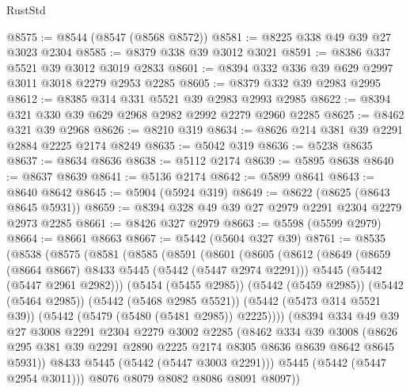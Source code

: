 \begin{lexlean}{RustStd}
\begin{coremodule}
{\begin{coremodule}
{{{{{{{{{{{{@8575 := @8544 (@8547 (@8568 @8572))
@8581 := @8225 @338 @49 @39 @27 @3023 @2304
@8585 := @8379 @338 @39 @3012 @3021
@8591 := @8386 @337 @5521 @39 @3012 @3019 @2833
@8601 := @8394 @332 @336 @39 @629 @2997 @3011 @3018 @2279 @2953 @2285
@8605 := @8379 @332 @39 @2983 @2995
@8612 := @8385 @314 @331 @5521 @39 @2983 @2993 @2985
@8622 := @8394 @321 @330 @39 @629 @2968 @2982 @2992 @2279 @2960 @2285
@8625 := @8462 @321 @39 @2968
@8626 := @8210 @319
@8634 := @8626 @214 @381 @39 @2291 @2884 @2225 @2174 @8249
@8635 := @5042 @319
@8636 := @5238 @8635
@8637 := @8634 @8636
@8638 := @5112 @2174
@8639 := @5895 @8638
@8640 := @8637 @8639
@8641 := @5136 @2174
@8642 := @5899 @8641
@8643 := @8640 @8642
@8645 := @5904 (@5924 @319)
@8649 := @8622 (@8625 (@8643 @8645 @5931))
@8659 := @8394 @328 @49 @39 @27 @2979 @2291 @2304 @2279 @2973 @2285
@8661 := @8426 @327 @2979
@8663 := @5598 (@5599 @2979)
@8664 := @8661 @8663
@8667 := @5442 (@5604 @327 @39)
@8761 := @8535
    (@8538
      (@8575
        (@8581
          (@8585
            (@8591
              (@8601
                (@8605
                  (@8612
                    (@8649
                      (@8659 (@8664 @8667) @8433 @5445 (@5442 (@5447 @2974 @2291)))
                      @5445
                      (@5442 (@5447 @2961 @2982)))
                    (@5454 (@5455 @2985))
                    (@5442 (@5459 @2985))
                    (@5442 (@5464 @2985))
                    (@5442 (@5468 @2985 @5521))
                    (@5442 (@5473 @314 @5521 @39))
                    (@5442 (@5479 (@5480 (@5481 @2985)) @2225))))
                (@8394
                  @334
                  @49
                  @39
                  @27
                  @3008
                  @2291
                  @2304
                  @2279
                  @3002
                  @2285
                  (@8462
                    @334
                    @39
                    @3008
                    (@8626
                      @295
                      @381
                      @39
                      @2291
                      @2890
                      @2225
                      @2174
                      @8305
                      @8636
                      @8639
                      @8642
                      @8645
                      @5931))
                  @8433
                  @5445
                  (@5442 (@5447 @3003 @2291)))
                @5445
                (@5442 (@5447 @2954 @3011)))
              @8076
              @8079
              @8082
              @8086
              @8091
              @8097))
}}}}}}}}}}}}
\end{coremodule}}
\end{coremodule}
\end{lexlean}
